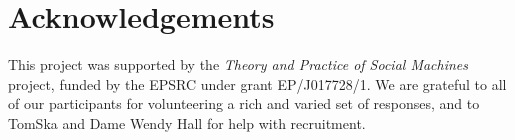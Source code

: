 \documentclass{sig-alternate}
\begin{document}




\section{Acknowledgements}

This project was supported by the \emph{Theory and Practice of Social Machines} project, funded by the EPSRC under grant EP/J017728/1. We are grateful to all of our participants for volunteering a rich and varied set of responses, and to TomSka and Dame Wendy Hall for help with recruitment.

% 

%
%
\balancecolumns
\end{document}
